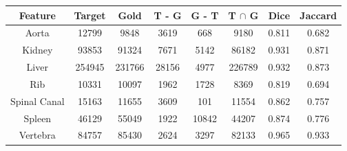 \begin{center}
\begin{tabular}{cccccccc}
\scriptsize \textbf{Feature} & \scriptsize \textbf{Target} & \scriptsize \textbf{Gold} & \scriptsize \textbf{T - G} & \scriptsize \textbf{G - T} & \scriptsize \textbf{T $\cap$ G} & \scriptsize \textbf{Dice} & \scriptsize \textbf{Jaccard} \\
\hline
\scriptsize Aorta & \scriptsize 12799 & \scriptsize 9848 & \scriptsize 3619 & \scriptsize 668 & \scriptsize 9180 & \scriptsize 0.811 & \scriptsize 0.682 \\
\scriptsize Kidney & \scriptsize 93853 & \scriptsize 91324 & \scriptsize 7671 & \scriptsize 5142 & \scriptsize 86182 & \scriptsize 0.931 & \scriptsize 0.871 \\
\scriptsize Liver & \scriptsize 254945 & \scriptsize 231766 & \scriptsize 28156 & \scriptsize 4977 & \scriptsize 226789 & \scriptsize 0.932 & \scriptsize 0.873 \\
\scriptsize Rib & \scriptsize 10331 & \scriptsize 10097 & \scriptsize 1962 & \scriptsize 1728 & \scriptsize 8369 & \scriptsize 0.819 & \scriptsize 0.694 \\
\scriptsize Spinal Canal & \scriptsize 15163 & \scriptsize 11655 & \scriptsize 3609 & \scriptsize 101 & \scriptsize 11554 & \scriptsize 0.862 & \scriptsize 0.757 \\
\scriptsize Spleen & \scriptsize 46129 & \scriptsize 55049 & \scriptsize 1922 & \scriptsize 10842 & \scriptsize 44207 & \scriptsize 0.874 & \scriptsize 0.776 \\
\scriptsize Vertebra & \scriptsize 84757 & \scriptsize 85430 & \scriptsize 2624 & \scriptsize 3297 & \scriptsize 82133 & \scriptsize 0.965 & \scriptsize 0.933 \\
\end{tabular}
\end{center}

